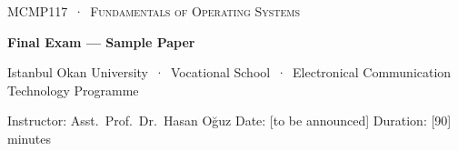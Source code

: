 \setlength{\parskip}{0.35em}
\newcommand{\pts}[1]{\hfill\textcolor{mintdeep}{\textbf{[#1~pt]}}}
\newcommand{\ans}[1]{\par\smallskip\noindent\begin{tikzpicture}\draw[muted!60,rounded corners=2pt] (0,0) rectangle (\linewidth,#1);\end{tikzpicture}\par\medskip}
\newcommand{\ganttgrid}[2]{\par\noindent\begin{tikzpicture}[x=0.7cm]
\node[anchor=east,font=\small\bfseries] at (-0.2,0.31) {#2};
\draw[muted!70] (0,0) rectangle (#1,0.62);
\foreach \t in {0,...,#1} {\draw[muted!70] (\t,0) -- (\t,-0.1) node[below,font=\scriptsize,text=muted,inner sep=1pt] {\t};}
\end{tikzpicture}\par\smallskip}
\newcommand{\frametable}[1]{\begin{tabular}{@{}l|*{12}{>{\centering\arraybackslash}p{0.6cm}|}@{}}
\multicolumn{13}{@{}l}{\textbf{#1}}\\ \hline
ref & 5 & 4 & 1 & 5 & 0 & 5 & 4 & 0 & 2 & 1 & 0 & 1 \\ \hline
fr.\ 0 &&&&&&&&&&&& \\ \hline
fr.\ 1 &&&&&&&&&&&& \\ \hline
fr.\ 2 &&&&&&&&&&&& \\ \hline
fault &&&&&&&&&&&& \\ \hline
\end{tabular}}

\thispagestyle{empty}
\begin{tcolorbox}[enhanced,colback=dark,colframe=dark,arc=0pt,boxrule=0pt,
  left=18pt,right=18pt,top=14pt,bottom=14pt,coltext=white]
{\small\color{mint}\textsc{MCMP117 \,·\, Fundamentals of Operating Systems}}\par\smallskip
{\headfont\fontsize{22}{26}\selectfont\bfseries Final Exam --- Sample Paper}\par\smallskip
{\small Istanbul Okan University \,·\, Vocational School \,·\, Electronical Communication Technology Programme}\par
{\small Instructor: Asst.\ Prof.\ Dr.\ Hasan Oğuz \quad Date: [to be announced] \quad Duration: [90] minutes}
\end{tcolorbox}

